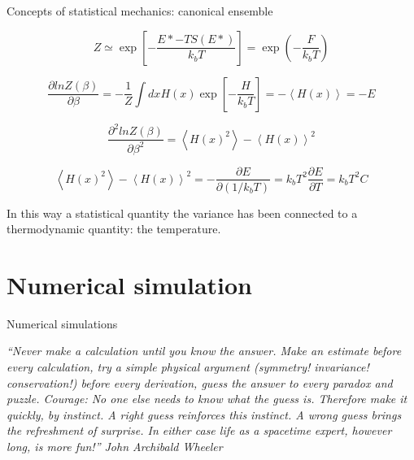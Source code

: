 \documentclass{beamer}
\begin{document}
\begin{frame}{Concepts of statistical mechanics: canonical ensemble\cite{peliti2011statistical} }

\begin{equation}
Z\simeq \exp\left[-\dfrac{E*-TS(E*)}{k_{b}T} \right]=\exp\left( - \frac{F}{k_{b}T}  \right)     
\end{equation}

\begin{equation}
\dfrac{\partial ln Z(\beta)}{\partial \beta}=-\dfrac{1}{Z}\int dx H(x)\exp\left[  -\dfrac{H}{k_{b}T}\right]=-\left\langle H(x) \right\rangle=-E
\end{equation}

\begin{equation}
\dfrac{\partial^{2} ln Z(\beta)}{\partial \beta^{2}}=\left\langle H(x)^{2} \right\rangle-\left\langle H(x) \right\rangle^{2}
\end{equation}

\begin{equation}
\left\langle H(x)^{2} \right\rangle-\left\langle H(x) \right\rangle^{2}=-\dfrac{\partial E}{\partial (1/k_{b}T)}=k_{b}T^{2}\dfrac{\partial E}{\partial T}=k_{b}T^{2}C
\end{equation}

In this way a statistical quantity the variance has been connected to a thermodynamic quantity: the temperature.

\end{frame}

\section{Numerical simulation}

\begin{frame}{}
\begin{center}
{\Huge Numerical simulations}
\end{center}
\begin{center}
\textit{“Never make a calculation until you know the answer. Make an estimate before every calculation, try a simple physical argument (symmetry! invariance! conservation!) before every derivation, guess the answer to every paradox and puzzle. Courage: No one else needs to know what the guess is. Therefore make it quickly, by instinct. A right guess reinforces this instinct. A wrong guess brings the refreshment of surprise. In either case life as a spacetime expert, however long, is more fun!” John Archibald Wheeler }
\end{center}
\end{frame}
\end{document}
